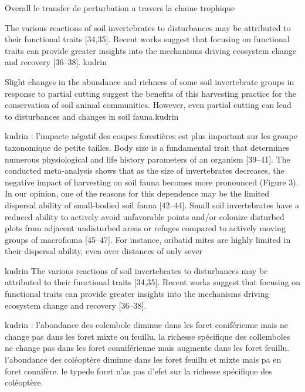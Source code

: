 

Overall le transfer de perturbation a travers la chaine trophique

The various reactions of soil invertebrates to disturbances may be attributed to their functional traits [34,35]. Recent works suggest that focusing on functional traits can provide greater insights into the mechanisms driving ecosystem change and recovery [36–38]. kudrin

Slight changes in the abundance and richness of some soil invertebrate groups in response to partial cutting suggest the benefits of this harvesting practice for the conservation of soil animal communities. However, even partial cutting can lead to disturbances and changes in soil fauna.kudrin




kudrin : 
l'impacte négatif des coupes forestières est plus important sur les groupe taxonomique de petite tailles.
Body size is a fundamental trait that determines numerous physiological and life history parameters of an organism [39–41]. The conducted meta-analysis shows that as the size of invertebrates decreases, the negative impact of harvesting on soil fauna becomes more pronounced (Figure 3). In our opinion, one of the reasons for this dependence may be the limited dispersal ability of small-bodied soil fauna [42–44]. Small soil invertebrates have a reduced ability to actively avoid unfavorable points and/or colonize disturbed plots from adjacent undisturbed areas or refuges compared to actively moving groups of macrofauna [45–47]. For instance, oribatid mites are highly limited in their dispersal ability, even over distances of only sever


kudrin The various reactions of soil invertebrates to disturbances may be attributed to their functional traits [34,35]. Recent works suggest that focusing on functional traits can provide greater insights into the mechanisms driving ecosystem change and recovery [36–38].



kudrin :
 l'abondance des colembole diminue dans les foret coniférienne mais ne change pas dans les foret mixte ou feuillu.
 la richesse spécifique des collemboles  ne change pas dans les foret conniférienne mais augmente dans les foret feuillu.
 l'abondance des coléoptère diminue dans les foret feuillu et mixte mais pa en foret connifère.
 le typede foret n'as pas d'efet sur la richesse spécifique des coléoptère.

